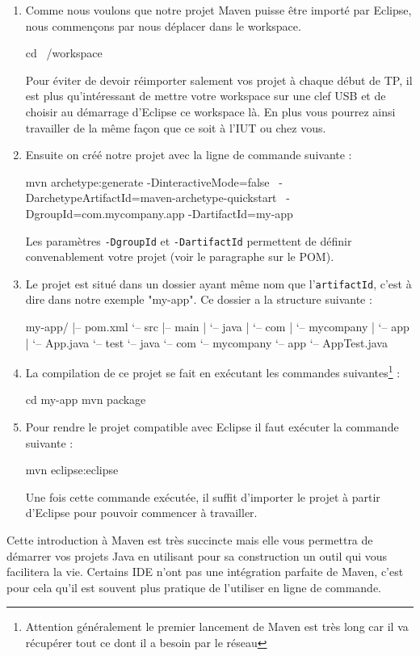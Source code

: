 \documentclass[a4paper,11pt]{article}
\begin{document}
\begin{enumerate}
  \item Comme nous voulons que notre projet Maven puisse être importé par Eclipse, nous commençons par nous déplacer dans le workspace.
  \begin{code_shell}
cd ~/workspace
  \end{code_shell}
  Pour éviter de devoir réimporter salement vos projet à chaque début de TP, il est plus qu'intéressant de mettre votre workspace 
  sur une clef USB et de choisir au démarrage d'Eclipse ce workspace là. En plus vous pourrez ainsi travailler de la même 
  façon que ce soit à l'IUT ou chez vous.
  \item Ensuite on créé notre projet avec la ligne de commande suivante :
  \begin{code_shell}
mvn archetype:generate -DinteractiveMode=false \
-DarchetypeArtifactId=maven-archetype-quickstart \
-DgroupId=com.mycompany.app -DartifactId=my-app 
  \end{code_shell}
  Les paramètres \texttt{-DgroupId} et \texttt{-DartifactId} permettent de définir convenablement votre projet (voir le paragraphe sur le POM).
  
  \item Le projet est situé dans un dossier ayant même nom que l'\texttt{artifactId}, c'est à dire dans notre exemple "my-app". 
  Ce dossier a la structure suivante :
  \begin{code_shell}
my-app/
|-- pom.xml
`-- src
    |-- main
    |   `-- java
    |       `-- com
    |           `-- mycompany
    |               `-- app
    |                   `-- App.java
    `-- test
        `-- java
            `-- com
                `-- mycompany
                    `-- app
                        `-- AppTest.java
  \end{code_shell}
  \item La compilation de ce projet se fait en exécutant les commandes suivantes\footnote{Attention généralement le 
  premier lancement de Maven est très long car il va récupérer tout ce dont il a besoin par le réseau} :
  \begin{code_shell}
cd my-app
mvn package
  \end{code_shell}
  \item Pour rendre le projet compatible avec Eclipse il faut exécuter la commande suivante : 
  \begin{code_shell}
mvn eclipse:eclipse
  \end{code_shell}
  Une fois cette commande exécutée, il suffit d'importer le projet à partir d'Eclipse pour pouvoir commencer à travailler.
\end{enumerate}
Cette introduction à Maven est très succincte mais elle vous permettra de démarrer vos projets Java en utilisant pour sa 
construction un outil qui vous facilitera la vie. Certains IDE n'ont pas une intégration parfaite de Maven, c'est pour 
cela qu'il est souvent plus pratique de l'utiliser en ligne de commande.
\end{document}
